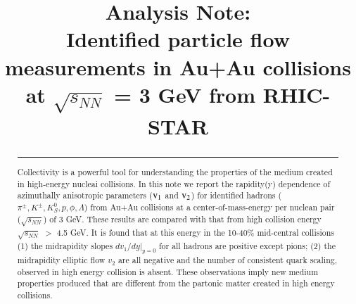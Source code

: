 \documentclass[preprint,showpacs,aps,prc,superscriptaddress]{revtex4-1}
\begin{document}
\preprint{}

\title{
\Huge{Analysis Note: \\ \textbf{Identified particle flow measurements in Au+Au collisions at $\sqrt{s_{NN}}$ = 3 GeV from RHIC-STAR}}
}


\begin{abstract}

\noindent\rule[0.25\baselineskip]{\textwidth}{1pt}
Collectivity is a powerful tool for understanding the properties of the medium created in high-energy nucleai collisions. In this note we report the rapidity(y) dependence of azimuthally anisotropic parameters ($\rm v_{1}$ and $\rm v_{2}$) for identified hadrons ($\pi^{\pm}, K^{\pm}, K_{S}^{0}, p, \phi, \Lambda$) from Au+Au collisions at a center-of-mass-energy per nuclean pair ($\sqrt{s_{NN}}$) of 3 GeV. These results are compared with that from high collision energy $\sqrt{s_{NN}}$ $>$ 4.5 GeV. It is found that at this energy in the 10-40\% mid-central collisions (1) the midrapidity slopes $dv_{1}/dy|_{y=0}$ for all hadrons are positive except pions; (2) the midrapidity elliptic flow $v_{2}$ are all negative and the number of consistent quark scaling, observed in high energy collision is absent. These observations imply new medium properties produced that are different from the partonic matter created in high energy collisions.
\end{abstract}

\maketitle
\listoffigures
\listoftables
\tableofcontents

\newpage


\linenumbers
\clearpage
\clearpage
\clearpage
\clearpage
\clearpage
\clearpage



\clearpage

%

%

%
\end{document}
